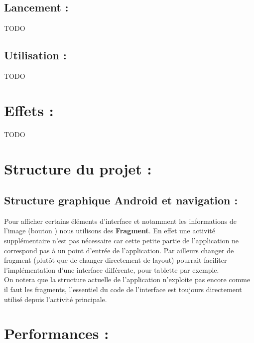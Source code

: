 \documentclass[12pt, a4paper]{article}
\begin{document}
\subsection{Lancement :}
TODO


\subsection{Utilisation :}
TODO



\section{Effets :}
TODO




\section{Structure du projet :}
\subsection{Structure graphique Android et navigation :}
Pour afficher certains éléments d'interface et notamment les informations de l'image (bouton \faInfoCircle) nous utilisons des \textbf{Fragment}. En effet une activité supplémentaire n'est pas nécessaire car cette petite partie de l'application ne correspond pas à un point d'entrée de l'application. Par ailleurs changer de fragment (plutôt que de changer directement de layout) pourrait faciliter l'implémentation d'une interface différente, pour tablette par exemple.
\\
On notera que la structure actuelle de l'application n'exploite pas encore comme il faut les fragments, l'essentiel du code de l'interface est toujours directement utilisé depuis l'activité principale.
\\


\section{Performances :}
\end{document}
